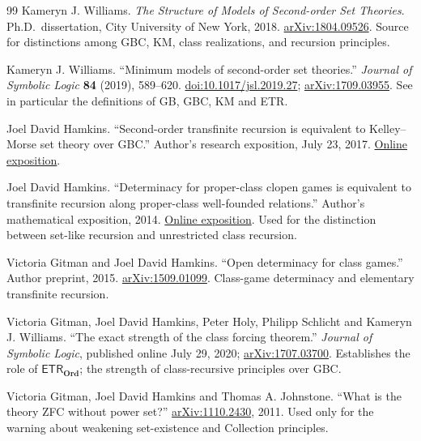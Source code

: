 \documentclass[11pt,letterpaper]{article}
\numberwithin{equation}{section}
\theoremstyle{definition}
\theoremstyle{remark}
\newcommand{\Ord}{\mathbf{Ord}}
\newcommand{\ETR}{\mathsf{ETR}}
\begin{document}
\begin{thebibliography}{99}
Kameryn J. Williams. \emph{The Structure of Models of Second-order Set
Theories}. Ph.D.\ dissertation, City University of New York, 2018.
\href{https://arxiv.org/abs/1804.09526}{arXiv:1804.09526}. Source for
distinctions among GBC, KM, class realizations, and recursion principles.

Kameryn J. Williams. ``Minimum models of second-order set theories.''
\emph{Journal of Symbolic Logic} \textbf{84} (2019), 589--620.
\href{https://doi.org/10.1017/jsl.2019.27}{doi:10.1017/jsl.2019.27};
\href{https://arxiv.org/abs/1709.03955}{arXiv:1709.03955}. See in particular the
definitions of GB, GBC, KM and ETR.

Joel David Hamkins. ``Second-order transfinite recursion is equivalent to
Kelley--Morse set theory over GBC.'' Author's research exposition, July 23, 2017.
\href{https://jdh.hamkins.org/second-order-transfinite-recursion-is-equivalent-to-kelley-morse-set-theory/}{Online exposition}.

Joel David Hamkins. ``Determinacy for proper-class clopen games is equivalent to
transfinite recursion along proper-class well-founded relations.'' Author's
mathematical exposition, 2014.
\href{https://jdh.hamkins.org/determinacy-for-proper-class-clopen-games-is-equivalent-to-transfinite-recursion-along-proper-class-well-founded-relations/}{Online exposition}.
Used for the distinction between set-like recursion and unrestricted class
recursion.

Victoria Gitman and Joel David Hamkins. ``Open determinacy for class games.''
Author preprint, 2015. \href{https://arxiv.org/abs/1509.01099}{arXiv:1509.01099}.
Class-game determinacy and elementary transfinite recursion.

Victoria Gitman, Joel David Hamkins, Peter Holy, Philipp Schlicht and Kameryn J.
Williams. ``The exact strength of the class forcing theorem.'' \emph{Journal of
Symbolic Logic}, published online July 29, 2020;
\href{https://arxiv.org/abs/1707.03700}{arXiv:1707.03700}. Establishes the role
of $\ETR_{\Ord}$; the strength of class-recursive principles over GBC.

Victoria Gitman, Joel David Hamkins and Thomas A. Johnstone. ``What is the
theory ZFC without power set?''
\href{https://arxiv.org/abs/1110.2430}{arXiv:1110.2430}, 2011. Used only for the
warning about weakening set-existence and Collection principles.


\end{thebibliography}
\end{document}
